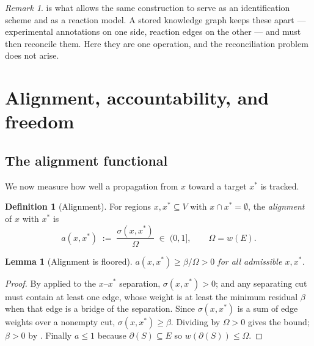 \documentclass[11pt,twocolumn,a4paper]{article}
\theoremstyle{thmstyle}
\newtheorem{lemma}[theorem]{Lemma}
\theoremstyle{definition}
\newtheorem{definition}[theorem]{Definition}
\theoremstyle{remark}
\newtheorem{remark}[theorem]{Remark}
\newcommand{\V}{V}
\newcommand{\E}{E}
\newcommand{\wt}{w}
\newcommand{\flo}{\beta}
\newcommand{\cut}{\partial}
\newcommand{\str}{\sigma}
\begin{document}
\begin{remark}
 is what allows the same construction to
serve as an identification scheme and as a reaction model. A stored
knowledge graph keeps these apart --- experimental annotations on one
side, reaction edges on the other --- and must then reconcile them.
Here they are one operation, and the reconciliation problem does not
arise.
\end{remark}

\section{Alignment, accountability, and freedom}
\label{sec:alignment}

\subsection{The alignment functional}

We now measure how well a propagation from $x$ toward a target $x^{*}$
is tracked.

\begin{definition}[Alignment]
\label{def:alignment}
For regions $x, x^{*} \subseteq \V$ with $x \cap x^{*} = \emptyset$,
the \emph{alignment} of $x$ with $x^{*}$ is
\begin{equation}
  a(x, x^{*}) \;:=\; \frac{\str(x, x^{*})}{\Omega}
  \;\in\; (0, 1],
  \qquad \Omega = \wt(\E).
  \label{eq:alignment}
\end{equation}
\end{definition}

\begin{lemma}[Alignment is floored]
\label{lem:align-floor}
$a(x,x^{*}) \geq \flo / \Omega > 0$ for all admissible $x, x^{*}$.
\end{lemma}

\begin{proof}
By  applied to the $x$--$x^{*}$ separation,
$\str(x,x^{*}) > 0$; and any separating cut must contain at least one
edge, whose weight is at least the minimum residual $\flo$ when that
edge is a bridge of the separation. Since $\str(x,x^{*})$ is a sum of
edge weights over a nonempty cut, $\str(x,x^{*}) \geq \flo$. Dividing
by $\Omega > 0$ gives the bound; $\flo > 0$ by .
Finally $a \leq 1$ because $\cut(S) \subseteq \E$ so
$\wt(\cut(S)) \leq \Omega$.
\end{proof}
\end{document}
